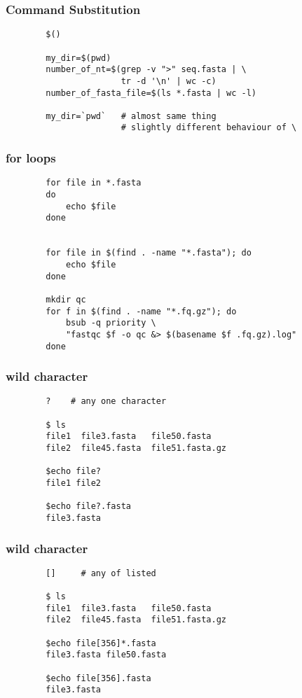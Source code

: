 \documentclass[xcolor=dvipsnames]{beamer}
\begin{document}
\begin{frame}[fragile]
	\frametitle{Command Substitution}
	\begin{verbatim}
		$()

		my_dir=$(pwd)
		number_of_nt=$(grep -v ">" seq.fasta | \
		               tr -d '\n' | wc -c)
		number_of_fasta_file=$(ls *.fasta | wc -l)

		my_dir=`pwd`   # almost same thing
		               # slightly different behaviour of \
	\end{verbatim}
\end{frame}

\begin{frame}[fragile]
	\frametitle{for loops}
	\begin{verbatim}
		for file in *.fasta
		do
		    echo $file
		done


		for file in $(find . -name "*.fasta"); do
		    echo $file
		done

		mkdir qc
		for f in $(find . -name "*.fq.gz"); do
		    bsub -q priority \
		    "fastqc $f -o qc &> $(basename $f .fq.gz).log"
		done
	\end{verbatim}
\end{frame}

\begin{frame}[fragile]
	\frametitle{wild character}
	\large
	\begin{verbatim}
		?    # any one character

		$ ls
		file1  file3.fasta   file50.fasta
		file2  file45.fasta  file51.fasta.gz

		$echo file?
		file1 file2

		$echo file?.fasta
		file3.fasta
	\end{verbatim}
\end{frame}

\begin{frame}[fragile]
	\frametitle{wild character}
	\large
	\begin{verbatim}
		[]     # any of listed

		$ ls
		file1  file3.fasta   file50.fasta
		file2  file45.fasta  file51.fasta.gz

		$echo file[356]*.fasta
		file3.fasta file50.fasta

		$echo file[356].fasta
		file3.fasta
	\end{verbatim}
\end{frame}
\end{document}
